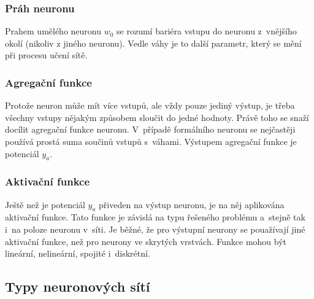 \documentclass[a4paper,12pt]{article}
\begin{document}
{{{{\subsubsection{Práh neuronu}

Prahem umělého neuronu $w_0$ se rozumí bariéra vstupu do neuronu z~vnějšího okolí (nikoliv z jiného neuronu). Vedle váhy je to další parametr, který se mění při procesu učení sítě.~\cite{nn}

\subsubsection{Agregační funkce}

Protože neuron může mít více vstupů, ale vždy pouze jediný výstup, je třeba všechny vstupy nějakým způsobem sloučit do jedné hodnoty. Právě toho se snaží docílit agregační funkce neuronu. V~případě formálního neuronu se nejčastěji používá prostá suma součinů vstupů s~váhami. Výstupem agregační funkce je potenciál $y_a$.~\cite{nn}


\subsubsection{Aktivační funkce}

Ještě než je potenciál $y_a$ přiveden na výstup neuronu, je na něj aplikována aktivační funkce. Tato funkce je závislá na typu řešeného problému a~stejně tak i~na poloze neuronu v~síti. Je běžné, že pro výstupní neurony se pouažívají jiné aktivační funkce, než pro neurony ve skrytých vrstvách. Funkce mohou být lineární, nelineární, spojité i~diskrétní.~\cite{nn}





\vspace{-20pt}

\subsection{Typy neuronových sítí}

}}}}
\end{document}
